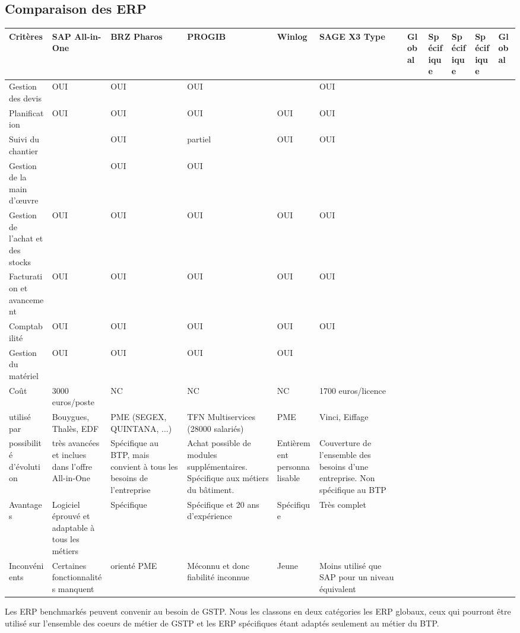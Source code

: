 \pagebreak
\subsection{Comparaison des ERP}

\hskip -15mm
\begin{longtable}{|m{2cm}|m{25mm}|m{25mm}|m{25mm}|m{25mm}|m{25mm}|}
\hline
Critères&SAP All-in-One&BRZ Pharos&PROGIB&Winlog&SAGE X3\endhead
\hline
Type&Global&Spécifique&Spécifique&Spécifique&Global\\
\hline
Gestion des devis&OUI&OUI&OUI&&OUI\\
\hline
Planification &OUI&OUI&OUI&OUI&OUI\\
\hline
Suivi du chantier&&OUI&partiel&OUI&OUI\\
\hline
Gestion de la main d’œuvre&&OUI&OUI&&\\
\hline
Gestion de l’achat et des stocks&OUI&OUI&OUI&OUI&OUI\\
\hline
Facturation et avancement&OUI&OUI&OUI&OUI&OUI\\
\hline
Comptabilité&OUI&OUI&OUI&OUI&OUI\\
\hline
Gestion du matériel&OUI&OUI&OUI&OUI&\\
\hline
Coût&3000 euros/poste&NC&NC&NC&1700 euros/licence\\
\hline
utilisé par&Bouygues, Thalès, EDF&PME (SEGEX, QUINTANA, ...)
&TFN Multiservices (28000 salariés)&PME&Vinci, Eiffage\\
\hline
possibilité d'évolution&très avancées et inclues dans l'offre All-in-One
&Spécifique au BTP, mais convient à tous les besoins de l'entreprise
&Achat possible de modules supplémentaires.
Spécifique aux métiers du bâtiment.
&Entièrement personnalisable&Couverture de l'ensemble des besoins
d'une entreprise. Non spécifique au BTP\\
\hline
Avantages&Logiciel éprouvé et adaptable à tous les métiers&Spécifique
&Spécifique et 20 ans d'expérience&Spécifique&Très complet\\
\hline
Inconvénients&Certaines fonctionnalités manquent&orienté PME
&Méconnu et donc fiabilité inconnue&Jeune
&Moins utilisé que SAP pour un niveau équivalent
\\\hline
\end{longtable}
\vskip 10pt

Les ERP benchmarkés peuvent convenir au besoin de GSTP. Nous les classons en deux
catégories les ERP globaux, ceux qui pourront être utilisé sur l'ensemble des coeurs
de métier de GSTP et les ERP spécifiques étant adaptés seulement au métier du BTP.

\vfill
\pagebreak
